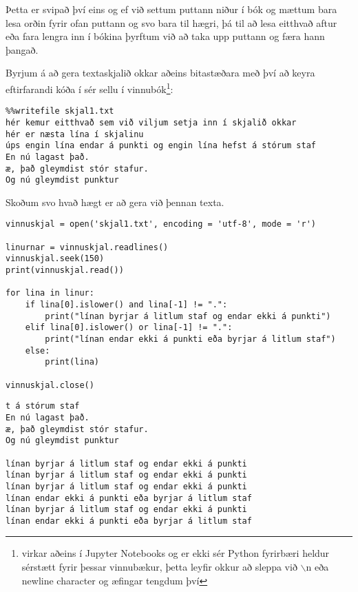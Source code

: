 Þetta er svipað því eins og ef við settum puttann niður í bók og mættum bara lesa orðin fyrir ofan puttann og svo bara til hægri, þá til að lesa eitthvað aftur eða fara lengra inn í bókina þyrftum við að taka upp puttann og færa hann þangað.

Byrjum á að gera textaskjalið okkar aðeins bitastæðara með því að keyra eftirfarandi kóða í sér sellu í vinnubók\footnote{virkar aðeins í Jupyter Notebooks og er ekki sér Python fyrirbæri heldur sérstætt fyrir þessar vinnubækur, þetta leyfir okkur að sleppa við $\backslash$n eða newline character og æfingar tengdum því}:
\begin{verbatim}
%%writefile skjal1.txt
hér kemur eitthvað sem við viljum setja inn í skjalið okkar
hér er næsta lína í skjalinu
úps engin lína endar á punkti og engin lína hefst á stórum staf
En nú lagast það.
æ, það gleymdist stór stafur.
Og nú gleymdist punktur
\end{verbatim}

Skoðum svo hvað hægt er að gera við þennan texta.

\begin{lstlisting}[caption=Hér sjáum við einfalda skjalavinnslu, label=lst:skjalavinnsla-open]
vinnuskjal = open('skjal1.txt', encoding = 'utf-8', mode = 'r')	

linurnar = vinnuskjal.readlines()
vinnuskjal.seek(150)
print(vinnuskjal.read())

for lina in linur:
	if lina[0].islower() and lina[-1] != ".":
		print("línan byrjar á litlum staf og endar ekki á punkti")
	elif lina[0].islower() or lina[-1] != ".":
		print("línan endar ekki á punkti eða byrjar á litlum staf")
	else:
		print(lina)

vinnuskjal.close()
\end{lstlisting}
\lstset{style=uttak}
\begin{lstlisting}
t á stórum staf
En nú lagast það.
æ, það gleymdist stór stafur.
Og nú gleymdist punktur

línan byrjar á litlum staf og endar ekki á punkti
línan byrjar á litlum staf og endar ekki á punkti
línan byrjar á litlum staf og endar ekki á punkti
línan endar ekki á punkti eða byrjar á litlum staf
línan byrjar á litlum staf og endar ekki á punkti
línan endar ekki á punkti eða byrjar á litlum staf
\end{lstlisting}
\lstset{style=venjulegt}

